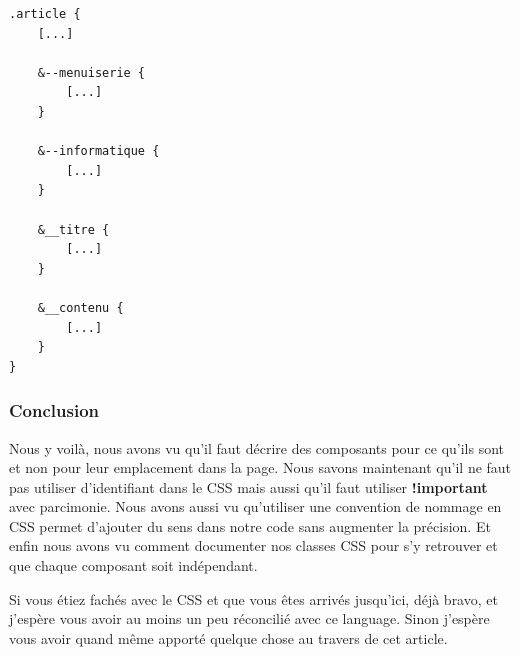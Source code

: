\documentclass[12pt, a4paper]{report}
\begin{document}
\begin{appendix}
\begin{lstlisting}
.article {
    [...]

    &--menuiserie {
        [...]
    }

    &--informatique {
        [...]
    }

    &__titre {
        [...]
    }

    &__contenu {
        [...]
    }
}
\end{lstlisting}

\subsubsection{Conclusion}

Nous y voilà, nous avons vu qu'il faut décrire des composants pour ce qu'ils sont et non pour leur emplacement dans la page.
Nous savons maintenant qu'il ne faut pas utiliser d'identifiant dans le CSS mais aussi qu'il faut utiliser \textbf{!important} avec parcimonie.
Nous avons aussi vu qu'utiliser une convention de nommage en CSS permet d'ajouter du sens dans notre code sans augmenter la précision.
Et enfin nous avons vu comment documenter nos classes CSS pour s'y retrouver et que chaque composant soit indépendant.

Si vous étiez fachés avec le CSS et que vous êtes arrivés jusqu'ici, déjà bravo, et j'espère vous avoir au moins un peu réconcilié avec ce language.
Sinon j'espère vous avoir quand même apporté quelque chose au travers de cet article.
\end{appendix}

\listoffigures
\makeutbmbackcover{}
\end{document}
